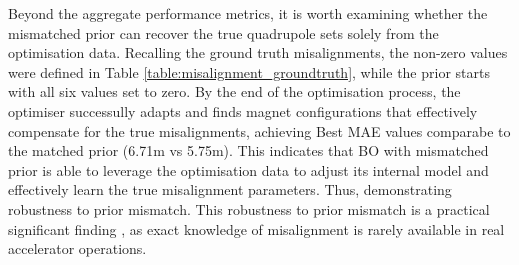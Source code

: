 Beyond the aggregate performance metrics, it is worth examining whether the mismatched prior can recover the true quadrupole sets solely from the optimisation data. 
Recalling the ground truth misalignments, the non-zero values were defined in Table \ref{table:misalignment_groundtruth},
while the prior starts with all six values set to zero. By the end of the optimisation process, the optimiser successully adapts and finds
magnet configurations that effectively compensate for the true misalignments, achieving Best MAE values comparabe to the matched prior (\SI{6.71}{\mu}m vs \SI{5.75}{\mu}m). This indicates that BO with mismatched prior is able to leverage the optimisation data to adjust its internal model and effectively learn the true misalignment parameters. Thus, demonstrating robustness to prior mismatch.
This robustness to prior mismatch is a practical significant finding , as exact knowledge of misalignment is rarely available in real accelerator operations.

